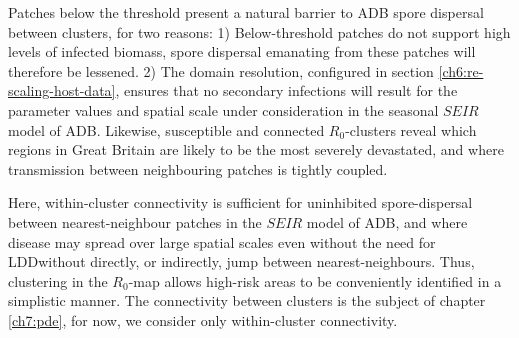 Patches below the threshold present a natural barrier to ADB spore dispersal between clusters, for two reasons: 
1) Below-threshold patches do not support high levels of infected biomass, spore dispersal emanating from these patches will therefore be lessened.
2) The domain resolution, configured in section \ref{ch6:re-scaling-host-data}, ensures that no secondary infections will result for the parameter values and spatial scale under consideration in the seasonal $SEIR$ model of ADB.
Likewise, susceptible and connected $R_0$-clusters reveal which regions in Great Britain are likely to be the most severely devastated, and
where transmission between neighbouring patches is tightly coupled.

Here, within-cluster connectivity is sufficient for uninhibited spore-dispersal between nearest-neighbour patches in the $SEIR$ model of ADB, 
and where disease may spread over large spatial scales even without the need for LDD\textemdash without directly, or indirectly, jump between nearest-neighbours.
Thus, clustering in the $R_0$-map allows high-risk areas to be conveniently identified in a simplistic manner. 
The connectivity between clusters is the subject of chapter \ref{ch7:pde}, for now, we consider only within-cluster connectivity.



